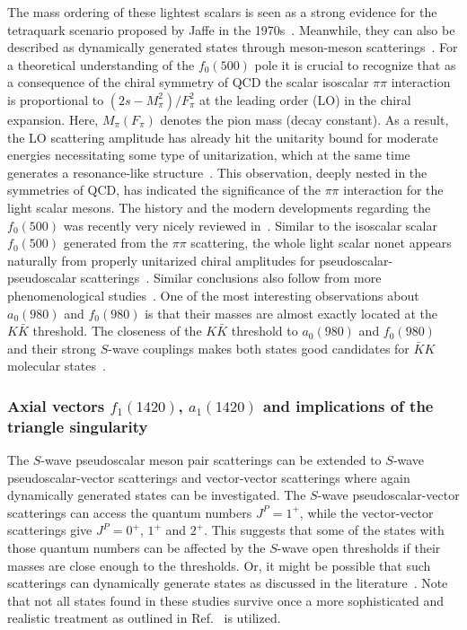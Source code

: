 The mass ordering of these lightest scalars is seen as a strong evidence for the
tetraquark scenario proposed by Jaffe in the
1970s~\cite{Jaffe:1976ig,Jaffe:1976ih}. Meanwhile, they can also be described
as dynamically generated states through meson-meson
scatterings~\cite{Pennington:1973xv,Au:1986vs,Morgan:1993td,Pelaez:2015qba}.
For a theoretical understanding of the $f_0(500)$ pole it is crucial to
recognize that as a consequence of the chiral symmetry of QCD the scalar isoscalar $\pi
\pi$ interaction is proportional to $(2s-M_\pi^2)/F_\pi^2$ at the leading order
(LO) in the chiral expansion. Here, $M_\pi (F_\pi)$ denotes the pion mass (decay
constant).
As a result, the LO scattering amplitude has already hit the
unitarity bound for moderate energies necessitating some type of unitarization,
which at the same time generates  a resonance-like
structure~\cite{Meissner:1990kz}.
This observation, deeply nested in the symmetries of QCD, has indicated the
significance of the $\pi\pi$ interaction for the light scalar mesons. The
history and the modern developments regarding the $f_0(500)$ was recently very
nicely reviewed in~\cite{Pelaez:2015qba}.
Similar to the isoscalar scalar $f_0(500)$ generated from the $\pi\pi$
scattering, the whole light scalar nonet appears naturally from properly unitarized chiral
amplitudes for pseudoscalar-pseudoscalar
scatterings~\cite{Oller:1997ng,Oller:1998hw,GomezNicola:2001as}. Similar
conclusions also follow from more phenomenological
studies~\cite{Weinstein:1990gu,Janssen:1994wn}.
One of the most interesting observations about $a_0(980)$ and $f_0(980)$ is that
their masses are almost exactly located at the $K\bar{K}$ threshold. The
closeness of the $K\bar{K}$ threshold to $a_0(980)$ and $f_0(980)$ and their
strong $S$-wave couplings makes both states good candidates for $\bar KK$
molecular states~\cite{Weinstein:1990gu,Baru:2003qq}.



\subsubsection{Axial vectors $f_1(1420)$, $a_1(1420)$ and implications of the 
triangle singularity}
\label{sec:TS}

The $S$-wave pseudoscalar meson pair scatterings can be extended to $S$-wave
pseudoscalar-vector scatterings and vector-vector scatterings where again
dynamically generated states can be investigated. The $S$-wave
pseudoscalar-vector scatterings can access the quantum numbers $J^P=1^+$, while
the vector-vector scatterings give $J^P=0^+$, $1^+$ and $2^+$.
This suggests that some of the states with those quantum numbers can be affected
by the $S$-wave open thresholds if their masses are close enough to the
thresholds. Or, it might be possible that such scatterings can dynamically
generate states as discussed in the
literature~\cite{Lutz:2003fm,Roca:2005nm,Geng:2008gx}.
Note that not all states found in these studies survive once a more
sophisticated and realistic treatment as outlined in Ref.~\cite{Gulmez:2016scm}
is utilized.

